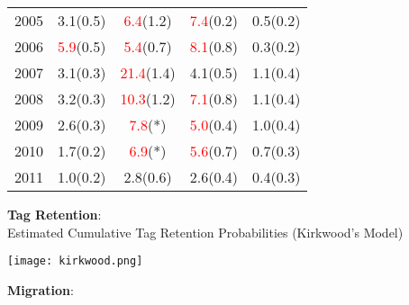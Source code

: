 \documentclass[paperwidth=58in,paperheight=47in,portrait]{baposter}
\begin{document}
\begin{poster}
{\begin{center}
{\begin{tabular}{r|c|c|c|c}
        2005 &   3.1(0.5) &   \textcolor{red}{6.4}(1.2) &   \textcolor{red}{7.4}(0.2) &   0.5(0.2) \\

        2006 &   \textcolor{red}{5.9}(0.5) &  \textcolor{red}{5.4}(0.7) &   \textcolor{red}{8.1}(0.8) &   0.3(0.2) \\

        2007 &   3.1(0.3) &  \textcolor{red}{21.4}(1.4) &   4.1(0.5) &   1.1(0.4) \\

        2008 &   3.2(0.3) &  \textcolor{red}{10.3}(1.2) &   \textcolor{red}{7.1}(0.8) &   1.1(0.4) \\

        2009 &   2.6(0.3) &        \textcolor{red}{7.8}(*) &   \textcolor{red}{5.0}(0.4) &   1.0(0.4) \\

        2010 &   1.7(0.2) &        \textcolor{red}{6.9}(*) &   \textcolor{red}{5.6}(0.7) &   0.7(0.3) \\

        2011 &   1.0(0.2) &   2.8(0.6) &   2.6(0.4) &   0.4(0.3) \\

\end{tabular}}\end{center}

\begin{multicols}{2}    %

\textbf{Tag Retention}: \\
Estimated Cumulative Tag Retention Probabilities (Kirkwood's Model)

\texttt{[image: kirkwood.png]}

\textbf{Migration}:\\

\end{multicols}}
\end{poster}
\end{document}

